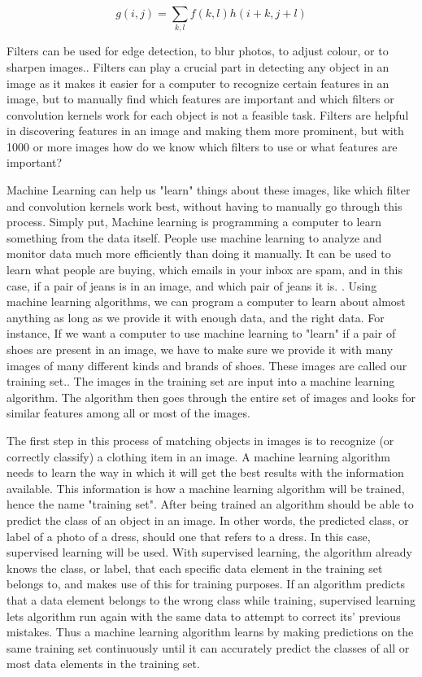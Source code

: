 \documentclass[12pt]{article} %
\begin{document}
\[g(i,j) = \sum_{k,l} f(k, l)h(i + k, j + l)\]
	
	Filters can be used for edge detection, to blur photos, to adjust colour, or to sharpen images.\cite{szeliski2010computer}. Filters can play a crucial part in detecting any object in an image as it makes it easier for a computer to recognize certain features in an image, but to manually find which features are important and which filters or convolution kernels work for each object is not a feasible task. Filters are helpful in discovering features in an image and making them more prominent, but with 1000 or more images how do we know which filters to use or what features are important? 
	
	Machine Learning can help us "learn" things about these images, like which filter and convolution kernels work best, without having to manually go through this process. Simply put, Machine learning is programming a computer to learn something from the data itself. People use machine learning to analyze and monitor data much more efficiently than doing it manually. It can be used to learn what people are buying, which emails in your inbox are spam, and in this case, if a pair of jeans is in an image, and which pair of jeans it is. \cite{aurelienMachineLearning}. Using machine learning algorithms, we can program a computer to learn about almost anything as long as we provide it with enough data, and the right data. For instance, If we want a computer to use machine learning to "learn" if a pair of shoes are present in an image, we have to make sure we provide it with many images of many different kinds and brands of shoes. These images are called our training set.\cite{aurelienMachineLearning}. The images in the training set are input into a machine learning algorithm. The algorithm then goes through the entire set of images and looks for similar features among all or most of the images. 
	
	The first step in this process of matching objects in images is to recognize (or correctly classify) a clothing item in an image. A machine learning algorithm needs to learn the way in which it will get the best results with the information available. This information is how a machine learning algorithm will be trained, hence the name "training set". After being trained an algorithm should be able to predict the class of an object in an image. In other words, the predicted class, or label of a photo of a dress, should one that refers to a dress. In this case, supervised learning will be used. With supervised learning, the algorithm already knows the class, or label, that each specific data element in the training set belongs to, and makes use of this for training purposes. If an algorithm predicts that a data element belongs to the wrong class while training, supervised learning lets algorithm run again with the same data to attempt to correct its' previous mistakes\cite{aurelienMachineLearning}. Thus a machine learning algorithm learns by making predictions on the same training set continuously until it can accurately predict the classes of all or most data elements in the training set. 
	
\end{document}
